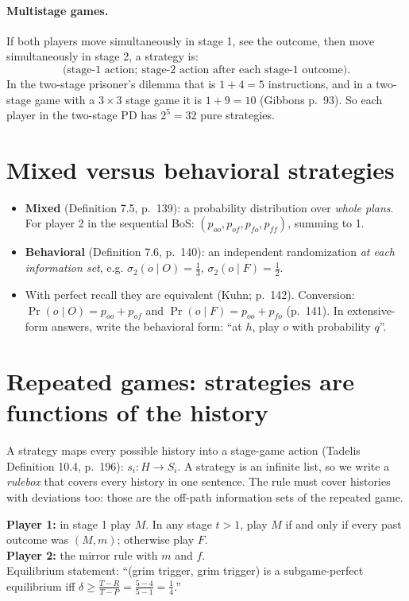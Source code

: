 \documentclass[11pt,a4paper]{article}
\begin{document}
\paragraph{Multistage games.} If both players move simultaneously in stage 1, see the outcome,
then move simultaneously in stage 2, a strategy is:
\[
\big(\text{stage-1 action};\ \text{stage-2 action after each stage-1 outcome}\big).
\]
In the two-stage prisoner's dilemma that is $1+4=5$ instructions, and in a two-stage game with a
$3\times3$ stage game it is $1+9=10$ (Gibbons p.~93). So each player in the two-stage PD has $2^5=32$
pure strategies.

\section{Mixed versus behavioral strategies}

\begin{itemize}
\item \textbf{Mixed} (Definition 7.5, p.~139): a probability distribution over \emph{whole plans}.
For player 2 in the sequential BoS: $(p_{oo},p_{of},p_{fo},p_{ff})$, summing to 1.
\item \textbf{Behavioral} (Definition 7.6, p.~140): an independent randomization \emph{at each
information set}, e.g. $\sigma_2(o\mid O)=\tfrac13$, $\sigma_2(o\mid F)=\tfrac12$.
\item With perfect recall they are equivalent (Kuhn; p.~142). Conversion:
$\Pr(o\mid O)=p_{oo}+p_{of}$ and $\Pr(o\mid F)=p_{oo}+p_{fo}$ (p.~141). In extensive-form answers,
write the behavioral form: ``at $h$, play $o$ with probability $q$''.
\end{itemize}

\section{Repeated games: strategies are functions of the history}

A strategy maps every possible history into a stage-game action (Tadelis Definition 10.4,
p.~196): $s_i:H\to S_i$. A strategy is an infinite list, so we write a \emph{rulebox} that covers
every history in one sentence. The rule must cover histories with deviations too: those are the
off-path information sets of the repeated game.

\begin{tmpl}[{Grim trigger, written completely (Tadelis p.~198; stage game $(M,m)=(4,4)$, $(M,f)=(-1,5)$, $(F,m)=(5,-1)$, $(F,f)=(1,1)$)}]
\textbf{Player 1:} in stage 1 play $M$. In any stage $t>1$, play $M$ if and only if every past
outcome was $(M,m)$; otherwise play $F$.\\
\textbf{Player 2:} the mirror rule with $m$ and $f$.\\[2pt]
Equilibrium statement: ``(grim trigger, grim trigger) is a subgame-perfect equilibrium iff
$\delta\ge \frac{T-R}{T-P}=\frac{5-4}{5-1}=\frac14$.''
\end{tmpl}
\end{document}
